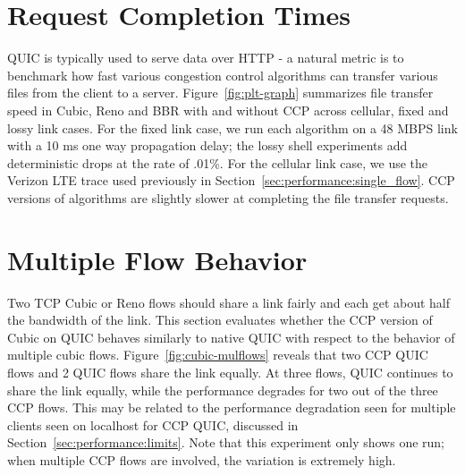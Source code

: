 \section{Request Completion Times}
\label{sec:performance:plt}

QUIC is typically used to serve data over HTTP - a natural metric is to benchmark how fast various congestion control algorithms can transfer various files from the client to a server.
Figure~\ref{fig:plt-graph} summarizes file transfer speed in Cubic, Reno and BBR with and without CCP across cellular, fixed and lossy link cases.
For the fixed link case, we run each algorithm on a 48 MBPS link with a 10 ms one way propagation delay; the lossy shell experiments add deterministic drops at the rate of .01\%.
For the cellular link case, we use the Verizon LTE trace used previously in Section~\ref{sec:performance:single_flow}.
CCP versions of algorithms are slightly slower at completing the file transfer requests.

\section{Multiple Flow Behavior}
\label{sec:performance:multiple_flows}

Two TCP Cubic or Reno flows should share a link fairly and each get about half the bandwidth of the link.
This section evaluates whether the CCP version of Cubic on QUIC behaves similarly to native QUIC with respect to the behavior of multiple cubic flows.
Figure~\ref{fig:cubic-mulflows} reveals that two CCP QUIC flows and 2 QUIC flows share the link equally.
At three flows, QUIC continues to share the link equally, while the performance degrades for two out of the three CCP flows.
This may be related to the performance degradation seen for multiple clients seen on localhost for CCP QUIC, discussed in Section~\ref{sec:performance:limits}.
Note that this experiment only shows one run; when multiple CCP flows are involved, the variation is extremely high.

